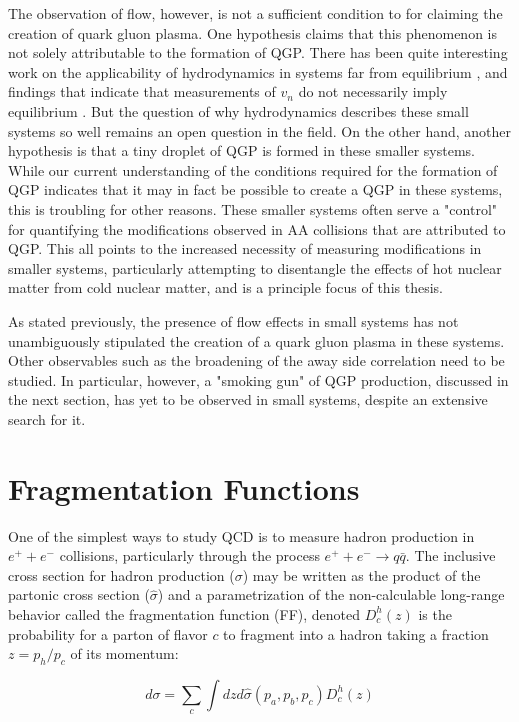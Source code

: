The observation of flow, however, is not a sufficient condition to for claiming the creation of quark gluon plasma. One hypothesis claims that this phenomenon is not solely attributable to the formation of QGP. There has been quite interesting work on the applicability of hydrodynamics in systems far from equilibrium \cite{Romatschke2018a}, and findings that indicate that measurements of $v_n$ do not necessarily imply equilibrium \cite{Romatschke2017}. But the question of why hydrodynamics describes these small systems so well \cite{Habich2016, Zhao2018a} remains an open question in the field. On the other hand, another hypothesis is that a tiny droplet of QGP is formed in these smaller systems. While our current understanding of the conditions required for the formation of QGP indicates that it may in fact be possible to create a QGP in these systems, this is troubling for other reasons. These smaller systems often serve a "control" for quantifying the modifications observed in AA collisions that are attributed to QGP. This all points to the increased necessity of measuring modifications in smaller systems, particularly attempting to disentangle the effects of hot nuclear matter from cold nuclear matter, and is a principle focus of this thesis.

As stated previously, the presence of flow effects in small systems has not unambiguously stipulated the creation of a quark gluon plasma in these systems.  Other observables such as the broadening of the away side correlation need to be studied. In particular, however, a "smoking gun" of QGP production, discussed in the next section, has yet to be observed in small systems, despite an extensive search for it.


\section{Fragmentation Functions}
\label{sec:FF}
One of the simplest ways to study QCD is to measure hadron production in $e^+ + e^-$ collisions, particularly through the process  $e^+ + e^- \rightarrow q\bar{q}$. The inclusive cross section for hadron production ($\sigma$) may be written as the product of the partonic cross section ($\hat{\sigma}$) and a parametrization of the non-calculable long-range behavior called the fragmentation function (FF), denoted $D_c^h(z)$ is the probability for a parton of flavor $c$ to fragment into a hadron taking a fraction $z=p_h/p_c$ of its momentum:

  \begin{equation}
    d\sigma = \sum_c\int dz d\hat{\sigma}(p_a,p_b,p_c)D_c^h(z)
    \label{eq:hadron_cross_section}
  \end{equation}

